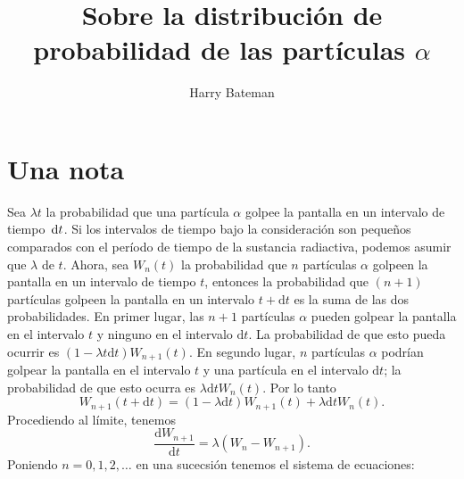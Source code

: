 \documentclass[10pt,twoside=false,twocolumn=false,BCOR=12mm,DIV=calc]{scrartcl} %
\theoremstyle{definition}
\begin{document}
\tableofcontents

\begin{titlepage}
  \extratitle{\textbf{\LARGE Traducción del artículo\\[\baselineskip] \textit{Las variaciones de la probabilidad en la\linebreak distribución de partículas $\alpha$}}}
  \title{Sobre la distribución de probabilidad de las partículas $\alpha$}
  \author{Harry Bateman}
  \begin{spacing}{1}
    \maketitle
  \end{spacing}
  \thispagestyle{empty}
\end{titlepage}

\section{Una nota}
\label{sec:note}


Sea $\lambda t$ la probabilidad que una partícula $\alpha$ golpee la pantalla en un intervalo de tiempo $\dl t$. Si los intervalos de tiempo bajo la consideración son pequeños comparados con el período de tiempo de la sustancia radiactiva, podemos asumir que $\lambda$ de $t$. Ahora, sea $W_n(t)$ la probabilidad que $n$ partículas $\alpha$ golpeen la pantalla en un intervalo de tiempo $t$, entonces la probabilidad que $(n+1)$ partículas golpeen la pantalla en un intervalo $t+\mathrm{d}t$ es la suma de las dos probabilidades. En primer lugar, las $n+1$ partículas $\alpha$ pueden golpear la pantalla en el intervalo $t$ y ninguno en el intervalo $\mathrm{d}t$. La probabilidad de que esto pueda ocurrir es $(1-\lambda t\mathrm{d}t)W_{n+1}(t)$. En segundo lugar, $n$ partículas $\alpha$ podrían golpear la pantalla en el intervalo $t$ y una partícula en el intervalo $\mathrm{d}t$; la probabilidad de que esto ocurra es $\lambda\mathrm{d}t W_n(t)$. Por lo tanto
\begin{equation*}
  W_{n+1}\left(t+\mathrm{d}t\right)=\left(1-\lambda\mathrm{d}t\right)W_{n+1}(t)+\lambda\mathrm{d}t W_n\left(t\right).
\end{equation*}
Procediendo al límite, tenemos
\begin{equation*}
  \frac{\mathrm{d}W_{n+1}}{\mathrm{d}t}=\lambda\left(W_n-W_{n+1}\right).
\end{equation*}
Poniendo $n=0,1,2,\ldots$ en una sucecsión tenemos el sistema de ecuaciones:
\end{document}
